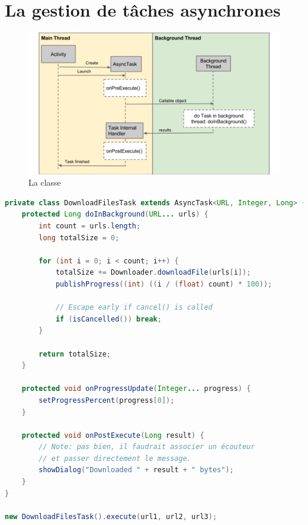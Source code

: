 \section{La gestion de tâches asynchrones}
\begin{figure}[H]
    \centering
    \includegraphics[width=1\textwidth]{assets/asynctask_seqdiagram.png}
    \caption{La classe }
\end{figure}

\begin{lstlisting}[language=java]
private class DownloadFilesTask extends AsyncTask<URL, Integer, Long> {
    protected Long doInBackground(URL... urls) {
        int count = urls.length;
        long totalSize = 0;
        
        for (int i = 0; i < count; i++) {
            totalSize += Downloader.downloadFile(urls[i]);
            publishProgress((int) ((i / (float) count) * 100));
            
            // Escape early if cancel() is called
            if (isCancelled()) break;
        }
        
        return totalSize;
    }
    
    protected void onProgressUpdate(Integer... progress) {
        setProgressPercent(progress[0]);
    }
    
    protected void onPostExecute(Long result) {
        // Note: pas bien, il faudrait associer un écouteur
        // et passer directement le message.
        showDialog("Downloaded " + result + " bytes");
    }
}

new DownloadFilesTask().execute(url1, url2, url3);
\end{lstlisting}

